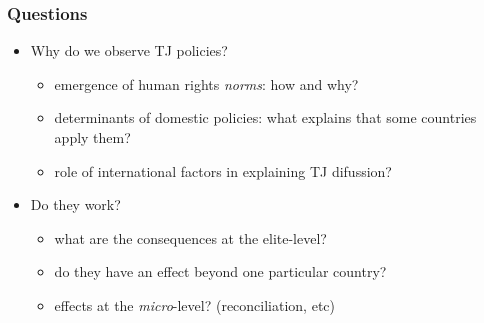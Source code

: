 \documentclass[aspectratio=43]{beamer}
\begin{document}







\begin{frame}
\frametitle{Questions}
\centering

\begin{itemize}
  \item Why do we observe TJ policies?
  \begin{itemize}
    \item emergence of human rights \textit{norms}: how and why?
    \item determinants of domestic policies: what explains that some countries apply them?
    \item role of international factors in explaining TJ difussion?
  \end{itemize}
  \item<2-> Do they work?
  \begin{itemize}
    \item what are the consequences at the elite-level?
    \item do they have an effect beyond one particular country?
    \item effects at the \textit{micro}-level? (reconciliation, etc)
  \end{itemize}

\end{itemize}

\end{frame}
\end{document}
